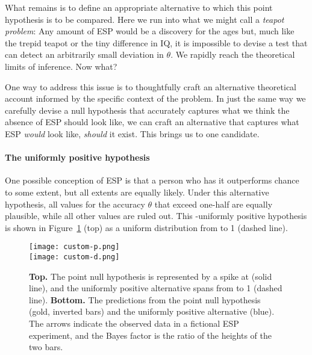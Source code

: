 What remains is to define an appropriate alternative to which this point hypothesis is to be compared.  Here we run into what we might call a \emph{teapot problem}: Any amount of ESP would be a discovery for the ages but, much like the trepid teapot or the tiny difference in IQ, it is impossible to devise a test that can detect an arbitrarily small deviation in $\theta$. We rapidly reach the theoretical limits of inference. Now what?

One way to address this issue is to thoughtfully craft an alternative theoretical account informed by the specific context of the problem. In just the same way we carefully devise a null hypothesis that accurately captures what we think the absence of ESP should look like, we can craft an alternative that captures what ESP \emph{would} look like, \emph{should} it exist.  This brings us to one candidate.

\paragraph{The uniformly positive hypothesis} One possible conception of ESP is that a person who has it outperforms chance to some extent, but all extents are equally likely. Under this alternative hypothesis, all values for the accuracy $\theta$ that exceed one-half are equally plausible, while all other values are ruled out. This \hyp{uniformly positive hypothesis} is shown in Figure~\ref{fig:pv} (top) as a uniform distribution from \textonehalf{} to 1 (dashed line).  

\begin{figure}[tb]
\texttt{[image: custom-p.png]}\\
\texttt{[image: custom-d.png]}
\caption{\textbf{Top.} The point null hypothesis is represented by a spike at \textonehalf{} (solid line), and the uniformly positive alternative spans from \textonehalf{} to 1 (dashed line). \textbf{Bottom.} The predictions from the point null hypothesis (gold, inverted bars) and the uniformly positive alternative (blue). The arrows indicate the observed data in a fictional ESP experiment, and the Bayes factor is the ratio of the heights of the two bars.}\label{fig:pv}
\end{figure}

